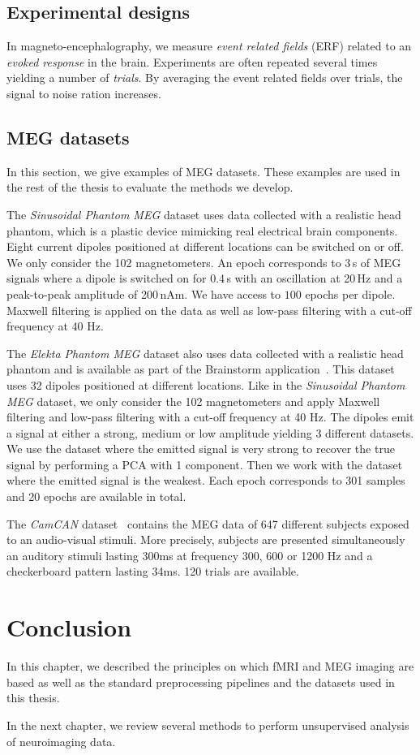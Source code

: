 \subsection{Experimental designs}
In magneto-encephalography, we measure \emph{event related fields} (ERF) related to an
\emph{evoked response} in the brain.
Experiments are often repeated several times yielding a number of \emph{trials}.
By averaging the event related fields over trials, the signal to noise ration increases.

\subsection{MEG datasets}
\label{sec:meg:datasets}
In this section, we give examples of MEG datasets. These examples are used in
the rest of the thesis to evaluate the methods we develop.

The \emph{Sinusoidal Phantom MEG} dataset uses data collected with a realistic head phantom, which is a plastic device mimicking real electrical brain components.
% 
Eight current dipoles positioned at different locations can be switched on or off.
% 
We only consider the 102 magnetometers.
% 
An epoch corresponds to 3\,s of MEG signals where a dipole is switched on for 0.4\,s with an oscillation at 20\,Hz and a peak-to-peak amplitude of 200\,nAm.
% 
We have access to $100$ epochs per dipole.
%
Maxwell filtering is applied on the data as well as low-pass filtering with a cut-off
frequency at 40 Hz.

The \emph{Elekta Phantom MEG} dataset also uses data collected with a realistic
head phantom and is available as part of the Brainstorm
application~\cite{tadel2011brainstorm}.
This dataset uses 32 dipoles positioned at different locations. Like in the
\emph{Sinusoidal Phantom MEG} dataset, we only
consider the 102 magnetometers and apply Maxwell filtering and low-pass filtering
with a cut-off frequency at 40 Hz. The dipoles emit a signal at either a strong, medium or low
amplitude yielding 3 different datasets.
We use the dataset where the emitted signal is very strong to recover the true signal
by performing a PCA with 1 component.
Then we work with the dataset where the emitted signal is the weakest.
Each epoch corresponds to 301 samples and 20 epochs are available in total.

The \emph{CamCAN} dataset~\cite{shafto2014cambridge}
contains the MEG data of 647 different
subjects exposed to an audio-visual stimuli. More precisely, subjects are presented simultaneously an
auditory stimuli lasting 300ms at frequency 300, 600 or 1200 Hz  and a
checkerboard pattern lasting 34ms. 120 trials are available.

\section{Conclusion}
In this chapter, we described the principles on which fMRI and MEG imaging
are based as well as the standard preprocessing pipelines and the datasets used
in this thesis.

In the next chapter, we review several methods to perform unsupervised analysis
of neuroimaging data.

